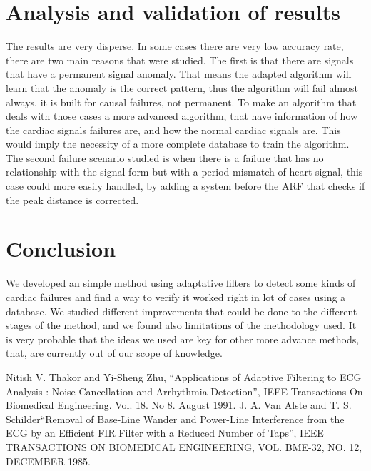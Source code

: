 \documentclass[conference]{IEEEtran}
\begin{document}
\section{Analysis and validation of results}
The results are very disperse. In some cases there are very low accuracy rate, there are two main reasons that were studied. The first is that there are signals that have a permanent signal anomaly. That means the adapted algorithm will learn that the anomaly is the correct pattern, thus the algorithm will fail almost always, it is built for causal failures, not permanent. To make an algorithm that deals with those cases a more advanced algorithm, that have information of how the cardiac signals failures are, and how the normal cardiac signals are. This would imply the necessity of a more complete database to train the algorithm. The second failure scenario studied is when there is a failure that has no relationship with the signal form but with a period mismatch of heart signal, this case could more easily handled, by adding a system before the ARF that checks if the peak distance is corrected. 

\section{Conclusion}
We developed an simple method using adaptative filters to detect some kinds of cardiac failures and find a way to verify it worked right in lot of cases using a database. We studied different improvements that could be done to the different stages of the method, and we found also limitations of the methodology used. It is very probable that the ideas we used are key for other more advance methods, that, are currently out of our scope of knowledge.

\begin{thebibliography}{00}
 Nitish V. Thakor and Yi-Sheng Zhu, ``Applications of Adaptive Filtering to ECG Analysis :
Noise Cancellation and Arrhythmia Detection'', IEEE Transactions On Biomedical Engineering. Vol. 18. No 8. August 1991.
 J. A. Van Alste and T. S. Schilder``Removal of Base-Line Wander and Power-Line Interference from the ECG by an Efficient FIR Filter with a Reduced Number of Taps'', IEEE TRANSACTIONS ON BIOMEDICAL ENGINEERING, VOL. BME-32, NO. 12, DECEMBER 1985.
\end{thebibliography}
\end{document}
